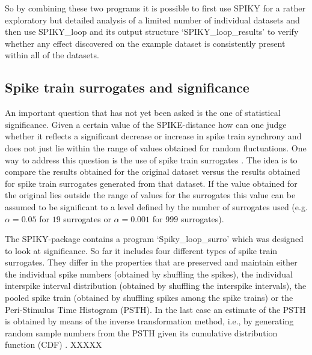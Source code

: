 \documentclass[10pt,twocolumn]{elsart5p}
\begin{document}
So by combining these two programs it is possible to first use SPIKY for a rather exploratory but detailed analysis of a limited number of individual datasets and then use SPIKY\_loop and its output structure `SPIKY\_loop\_results' to verify whether any effect discovered on the example dataset is consistently present within all of the datasets.


\subsection{\label{ss:Spike-train-surrogates} Spike train surrogates and significance}

An important question that has not yet been asked is the one of statistical significance. Given a certain value of the SPIKE-distance how can one judge whether it reflects a significant decrease or increase in spike train synchrony and does not just lie within the range of values obtained for random fluctuations. One way to address this question is the use of spike train surrogates \citep{Kass05, Gruen09, Louis10}. The idea is to compare the results obtained for the original dataset versus the results obtained for spike train surrogates generated from that dataset. If the value obtained for the original lies outside the range of values for the surrogates this value can be assumed to be significant to a level defined by the number of surrogates used (e.g. $\alpha = 0.05$ for $19$ surrogates or $\alpha = 0.001$ for $999$ surrogates).

The SPIKY-package contains a program `Spiky\_loop\_\-surro' which was designed to look at significance. So far it includes four different types of spike train surrogates. They differ in the properties that are preserved and maintain either the individual spike numbers (obtained by shuffling the spikes), the individual interspike interval distribution (obtained by shuffling the interspike intervals), the pooled spike train (obtained by shuffling spikes among the spike trains) or the Peri-Stimulus Time Histogram (PSTH). In the last case an estimate of the PSTH is obtained by means of the inverse transformation method, i.e., by generating random sample numbers from the PSTH given its cumulative distribution function (CDF) \citep{Ross97}. XXXXX
\end{document}
